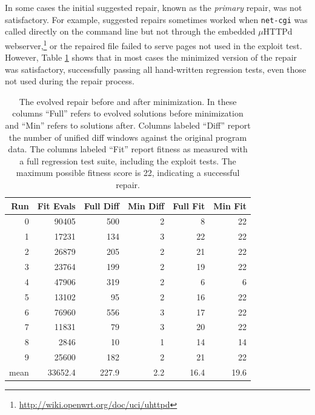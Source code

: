 \documentclass{sigcomm-alternate}
\begin{document}
In some cases the initial suggested repair, known as the
\emph{primary} repair, was not satisfactory.  For
example, suggested repairs sometimes worked when \texttt{net-cgi} was
called directly on the command line but not through the embedded
$\mu$HTTPd webserver,\footnote{\url{http://wiki.openwrt.org/doc/uci/uhttpd}}
or the repaired file failed to serve pages not used in the
exploit test.  However, Table \ref{minimized-stats} shows that in most
cases the minimized version of the repair was satisfactory,
successfully passing all hand-written regression tests, even those not used
during the repair process. 

\begin{table}[htb]
\centering
\begin{tabular}{rrrrrr}
Run  & Fit Evals & Full Diff & Min Diff & Full Fit & Min Fit \\
\toprule
0    & 90405     & 500       & 2        & 8        & 22      \\
1    & 17231     & 134       & 3        & 22       & 22      \\
2    & 26879     & 205       & 2        & 21       & 22      \\
3    & 23764     & 199       & 2        & 19       & 22      \\
4    & 47906     & 319       & 2        & 6        & 6       \\
5    & 13102     & 95        & 2        & 16       & 22      \\
6    & 76960     & 556       & 3        & 17       & 22      \\
7    & 11831     & 79        & 3        & 20       & 22      \\
8    & 2846      & 10        & 1        & 14       & 14      \\
9    & 25600     & 182       & 2        & 21       & 22      \\
\bottomrule
mean & 33652.4   & 227.9     & 2.2      & 16.4     & 19.6    \\
\end{tabular}
\caption{\label{minimized-stats}The 
evolved repair before and after minimization.  In these columns ``Full''
refers to evolved solutions before minimization and ``Min'' refers to
solutions after.  Columns labeled ``Diff'' report the number
of unified diff windows against the original program data. The columns
labeled ``Fit'' report fitness as measured with a full regression test
suite, including the exploit tests.  The maximum possible fitness
score is 22, indicating a successful repair.}
\end{table}
\end{document}
